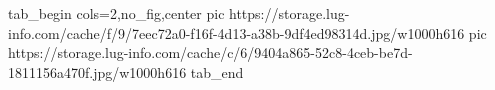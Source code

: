 
 
 
 
 


\ifcmt
  tab_begin cols=2,no_fig,center
     pic https://storage.lug-info.com/cache/f/9/7eec72a0-f16f-4d13-a38b-9df4ed98314d.jpg/w1000h616%
     pic https://storage.lug-info.com/cache/c/6/9404a865-52c8-4ceb-be7d-1811156a470f.jpg/w1000h616%
  tab_end
\fi
